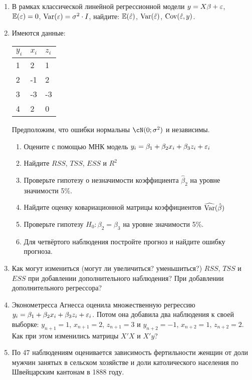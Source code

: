 \documentclass[12pt, a4paper]{article}
\theoremstyle{definition}
\begin{document}
\begin{enumerate}

\item В рамках классической линейной регрессионной модели $y=X\beta+ \varepsilon$, $\mathbb{E}(\varepsilon)=0$, $\operatorname{Var}(\varepsilon)=\sigma^2 \cdot I$, найдите: $\mathbb{E}(\hat{\varepsilon})$, $\operatorname{Var}(\hat{\varepsilon})$, $\operatorname{Cov}(\hat{\varepsilon}, y)$.

\item Имеются данные:

\begin{tabular}{lll}
\toprule
$y_i$ & $x_i$ & $z_i$ \\
\midrule
1 & 2 & 1 \\
2 & -1 & 2 \\
3 & -3 & -3 \\
4 & 2 & 0 \\
\bottomrule
\end{tabular}

Предположим, что ошибки нормальны $\cN(0;\sigma^2)$ и независимы.

\begin{enumerate}
\item Оцените с помощью МНК модель $y_i=\beta_1 + \beta_2 x_i + \beta_3 z_i + \varepsilon_i$
\item Найдите $RSS$, $TSS$, $ESS$ и $R^2$
\item Проверьте гипотезу о незначимости коэффициента $\hat\beta_2$ на уровне значимости 5\%.
\item Найдите оценку ковариационной матрицы коэффициентов $\widehat{\operatorname{Var}}(\hat\beta)$
\item Проверьте гипотезу $H_0: \beta_2 = \beta_3$ на уровне значимости 5\%.
\item Для четвёртого наблюдения постройте прогноз и найдите ошибку прогноза.
\end{enumerate}

\item Как могут измениться (могут ли увеличиться? уменьшиться?) $RSS$, $TSS$ и $ESS$ при добавлении дополнительного наблюдения? При добавлении дополнительного регрессора?

\item Эконометресса Агнесса оценила множественную регрессию $y_i = \beta_1 + \beta_2 x_i + \beta_3 z_i + \varepsilon_i$. Потом она добавила два наблюдения к своей выборке: $y_{n+1}=1$, $x_{n+1}=2$, $z_{n+1}=3$ и $y_{n+2}=-1$, $x_{n+2}=1$, $z_{n+2}=2$. Как при этом изменились матрицы $X'X$ и $X'y$?


\item По 47 наблюдениям оценивается зависимость фертильности женщин от доли мужчин занятых в сельском хозяйстве и доли католического населения по Швейцарским кантонам в 1888 году.


\end{enumerate}
\end{document}
